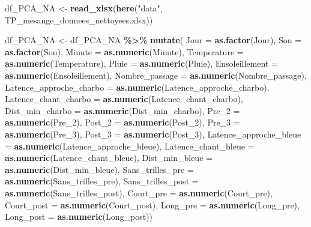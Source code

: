 \documentclass[
  french,
]{article}
\newenvironment{Shaded}{\begin{snugshade}}{\end{snugshade}}
\newcommand{\AttributeTok}[1]{\textcolor[rgb]{0.13,0.29,0.53}{#1}}
\newcommand{\FunctionTok}[1]{\textcolor[rgb]{0.13,0.29,0.53}{\textbf{#1}}}
\newcommand{\NormalTok}[1]{#1}
\newcommand{\OtherTok}[1]{\textcolor[rgb]{0.56,0.35,0.01}{#1}}
\newcommand{\SpecialCharTok}[1]{\textcolor[rgb]{0.81,0.36,0.00}{\textbf{#1}}}
\newcommand{\StringTok}[1]{\textcolor[rgb]{0.31,0.60,0.02}{#1}}
\begin{document}
\begin{Shaded}
\begin{Highlighting}[]
\NormalTok{df\_PCA\_NA }\OtherTok{\textless{}{-}} \FunctionTok{read\_xlsx}\NormalTok{(}\FunctionTok{here}\NormalTok{(}\StringTok{"data"}\NormalTok{, }\StringTok{\textquotesingle{}TP\_mesange\_donnees\_nettoyees.xlsx\textquotesingle{}}\NormalTok{))}

\NormalTok{df\_PCA\_NA }\OtherTok{\textless{}{-}}\NormalTok{ df\_PCA\_NA }\SpecialCharTok{\%\textgreater{}\%} \FunctionTok{mutate}\NormalTok{(}
  \AttributeTok{Jour =} \FunctionTok{as.factor}\NormalTok{(Jour),}
  \AttributeTok{Son =} \FunctionTok{as.factor}\NormalTok{(Son),}
  \AttributeTok{Minute =} \FunctionTok{as.numeric}\NormalTok{(Minute), }
  \AttributeTok{Temperature =} \FunctionTok{as.numeric}\NormalTok{(Temperature), }
  \AttributeTok{Pluie =} \FunctionTok{as.numeric}\NormalTok{(Pluie), }
  \AttributeTok{Ensoleillement =} \FunctionTok{as.numeric}\NormalTok{(Ensoleillement), }
  \AttributeTok{Nombre\_passage =} \FunctionTok{as.numeric}\NormalTok{(Nombre\_passage), }
  \AttributeTok{Latence\_approche\_charbo =} \FunctionTok{as.numeric}\NormalTok{(Latence\_approche\_charbo), }
  \AttributeTok{Latence\_chant\_charbo =} \FunctionTok{as.numeric}\NormalTok{(Latence\_chant\_charbo), }
  \AttributeTok{Dist\_min\_charbo =} \FunctionTok{as.numeric}\NormalTok{(Dist\_min\_charbo), }
  \AttributeTok{Pre\_2 =} \FunctionTok{as.numeric}\NormalTok{(Pre\_2), }
  \AttributeTok{Post\_2 =} \FunctionTok{as.numeric}\NormalTok{(Post\_2), }
  \AttributeTok{Pre\_3 =} \FunctionTok{as.numeric}\NormalTok{(Pre\_3), }
  \AttributeTok{Post\_3 =} \FunctionTok{as.numeric}\NormalTok{(Post\_3), }
  \AttributeTok{Latence\_approche\_bleue =} \FunctionTok{as.numeric}\NormalTok{(Latence\_approche\_bleue), }
  \AttributeTok{Latence\_chant\_bleue =} \FunctionTok{as.numeric}\NormalTok{(Latence\_chant\_bleue), }
  \AttributeTok{Dist\_min\_bleue =} \FunctionTok{as.numeric}\NormalTok{(Dist\_min\_bleue), }
  \AttributeTok{Sans\_trilles\_pre =} \FunctionTok{as.numeric}\NormalTok{(Sans\_trilles\_pre), }
  \AttributeTok{Sans\_trilles\_post =} \FunctionTok{as.numeric}\NormalTok{(Sans\_trilles\_post), }
  \AttributeTok{Court\_pre =} \FunctionTok{as.numeric}\NormalTok{(Court\_pre), }
  \AttributeTok{Court\_post =} \FunctionTok{as.numeric}\NormalTok{(Court\_post), }
  \AttributeTok{Long\_pre =} \FunctionTok{as.numeric}\NormalTok{(Long\_pre), }
  \AttributeTok{Long\_post =} \FunctionTok{as.numeric}\NormalTok{(Long\_post))}
\end{Highlighting}
\end{Shaded}
\end{document}

